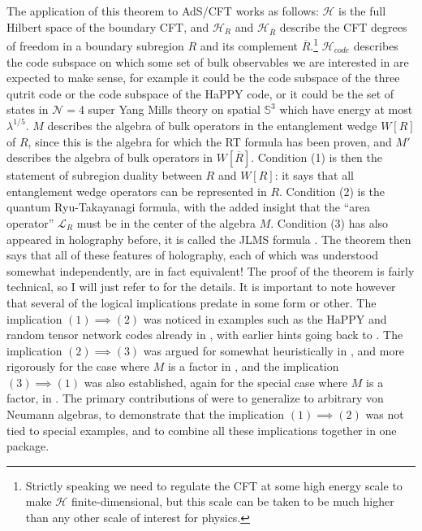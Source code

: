 \documentclass[toc]{PoS}
\newcommand{\LR}{\mathcal{L}_R}
\newcommand{\Hh}{\mathcal{H}}
\newcommand{\Hc}{\mathcal{H}_{code}}
\newcommand{\ol}{\overline}
\begin{document}
The application of this theorem to AdS/CFT works as follows: $\Hh$ is the full Hilbert space of the boundary CFT, and $\Hh_R$ and $\Hh_{\ol{R}}$ describe the CFT degrees of freedom in a boundary subregion $R$ and its complement $\ol{R}$.\footnote{Strictly speaking we need to regulate the CFT at some high energy scale to make $\Hh$ finite-dimensional, but this scale can be taken to be much higher than any other scale of interest for physics.}  $\Hc$ describes the code subspace on which some set of bulk observables we are interested in are expected to make sense, for example it could be the code subspace of the three qutrit code or the code subspace of the HaPPY code, or it could be the set of states in $\mathcal{N}=4$ super Yang Mills theory on spatial $\mathbb{S}^{3}$ which have energy at most $\lambda^{1/5}$.  $M$ describes the algebra of bulk operators in the entanglement wedge $W[R]$ of $R$, since this is the algebra for which the RT formula has been proven, and $M'$ describes the algebra of bulk operators in $W[\ol{R}]$.  Condition (1) is then the statement of subregion duality between $R$ and $W[R]$: it says that all entanglement wedge operators can be represented in $R$.  Condition (2) is the quantum Ryu-Takayanagi formula, with the added insight that the ``area operator'' $\LR$ must be in the center of the algebra $M$.  Condition (3) has also appeared in holography before, it is called the JLMS formula \cite{Jafferis:2015del}.  The theorem then says that all of these features of holography, each of which was understood somewhat independently, are in fact equivalent!  The proof of the theorem is fairly technical, so I will just refer to \cite{Harlow:2016vwg} for the details.  It is important to note however that several of the logical implications predate \cite{Harlow:2016vwg} in some form or other.  The implication $(1)\implies(2)$ was noticed in examples such as the  HaPPY and random tensor network codes already in \cite{Pastawski:2015qua,Hayden:2016cfa}, with earlier hints going back to \cite{Swingle:2009bg}. The implication $(2)\implies(3)$ was argued for somewhat heuristically in \cite{Jafferis:2015del}, and more rigorously for the case where $M$ is a factor in \cite{Dong:2016eik}, and the implication $(3)\implies(1)$ was also established, again for the special case where $M$ is a factor, in \cite{Dong:2016eik}.  The primary contributions of \cite{Harlow:2016vwg} were to generalize to arbitrary von Neumann algebras, to demonstrate that the implication $(1)\implies(2)$ was not tied to special examples, and to combine all these implications together in one package.
\end{document}

